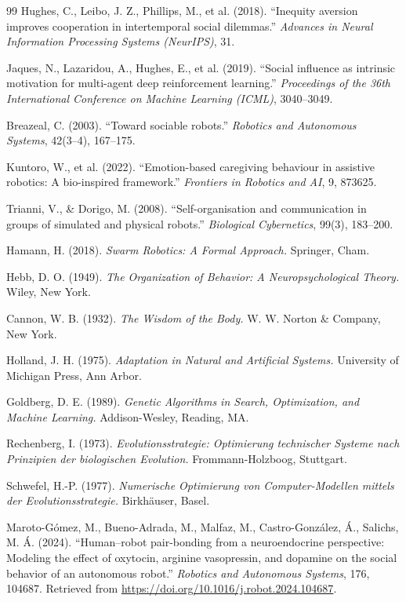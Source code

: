 \begin{thebibliography}{99}
Hughes, C., Leibo, J. Z., Phillips, M., et al. (2018).
``Inequity aversion improves cooperation in intertemporal social dilemmas.''
\textit{Advances in Neural Information Processing Systems (NeurIPS)}, 31.

Jaques, N., Lazaridou, A., Hughes, E., et al. (2019).
``Social influence as intrinsic motivation for multi-agent deep reinforcement learning.''
\textit{Proceedings of the 36th International Conference on Machine Learning (ICML)}, 3040–3049.

Breazeal, C. (2003).
``Toward sociable robots.''
\textit{Robotics and Autonomous Systems}, 42(3–4), 167–175.

Kuntoro, W., et al. (2022).
``Emotion-based caregiving behaviour in assistive robotics: A bio-inspired framework.''
\textit{Frontiers in Robotics and AI}, 9, 873625.

Trianni, V., \& Dorigo, M. (2008).
``Self-organisation and communication in groups of simulated and physical robots.''
\textit{Biological Cybernetics}, 99(3), 183–200.

Hamann, H. (2018).
\textit{Swarm Robotics: A Formal Approach.}
Springer, Cham.

Hebb, D. O. (1949).
\textit{The Organization of Behavior: A Neuropsychological Theory.}
Wiley, New York.

Cannon, W. B. (1932).
\textit{The Wisdom of the Body.}
W. W. Norton \& Company, New York.

Holland, J. H. (1975).
\textit{Adaptation in Natural and Artificial Systems.}
University of Michigan Press, Ann Arbor.

Goldberg, D. E. (1989).
\textit{Genetic Algorithms in Search, Optimization, and Machine Learning.}
Addison-Wesley, Reading, MA.

Rechenberg, I. (1973).
\textit{Evolutionsstrategie: Optimierung technischer Systeme nach Prinzipien der biologischen Evolution.}
Frommann-Holzboog, Stuttgart.

Schwefel, H.-P. (1977).
\textit{Numerische Optimierung von Computer-Modellen mittels der Evolutionsstrategie.}
Birkhäuser, Basel.

Maroto-Gómez, M., Bueno-Adrada, M., Malfaz, M., Castro-González, Á., Salichs, M. Á. (2024).
“Human–robot pair-bonding from a neuroendocrine perspective: Modeling the effect of oxytocin, arginine vasopressin, and dopamine on the social behavior of an autonomous robot.”
\textit{Robotics and Autonomous Systems}, 176, 104687.
Retrieved from \url{https://doi.org/10.1016/j.robot.2024.104687}.

\end{thebibliography}


